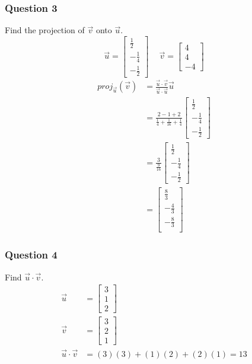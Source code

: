 \documentclass{math}
\begin{document}
\subsubsection*{Question 3}
Find the projection of \( \vec{v} \) onto \( \vec{u} \).
\[ \vec{u} = \begin{bmatrix}\frac{1}{2} \\ -\frac{1}{4} \\
  -\frac{1}{2}\end{bmatrix} \quad\
  \vec{v} = \begin{bmatrix}4 \\ 4 \\ -4\end{bmatrix} \]
\begin{align*}
  proj_{\vec{u}}(\vec{v}) &=
    \frac{\vec{u}\cdot\vec{v}}{\vec{u}\cdot\vec{u}}\vec{u} \\
  &= \frac{2-1+2}{\frac{1}{4}+\frac{1}{16}+\frac{1}{4}}\begin{bmatrix}
    \frac{1}{2} \\ -\frac{1}{4} \\ -\frac{1}{2}
  \end{bmatrix} \\
  &= \frac{3}{\frac{9}{16}}\begin{bmatrix}
    \frac{1}{2} \\ -\frac{1}{4} \\ -\frac{1}{2}
  \end{bmatrix} \\
  &= \begin{bmatrix}
    \frac{8}{3} \\
    -\frac{4}{3} \\
    -\frac{8}{3} \\
  \end{bmatrix}
\end{align*}

\subsubsection*{Question 4}
Find \( \vec{u}\cdot\vec{v} \).
\begin{align*}
  \vec{u} &= \begin{bmatrix}3 \\ 1 \\ 2\end{bmatrix} \\
  \vec{v} &= \begin{bmatrix}3 \\ 2 \\ 1\end{bmatrix} \\
  \vec{u}\cdot\vec{v} &= (3)(3)+(1)(2)+(2)(1) = 13
\end{align*}
\end{document}
